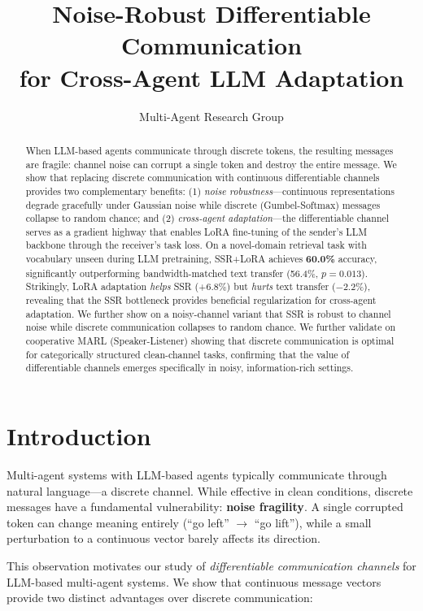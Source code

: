 \documentclass[11pt,a4paper]{article}
\title{\Large\bfseries Noise-Robust Differentiable Communication\\for Cross-Agent LLM Adaptation}
\author{Multi-Agent Research Group}
\date{}
\begin{document}
\maketitle

\begin{abstract}
When LLM-based agents communicate through discrete tokens, the resulting messages are fragile: channel noise can corrupt a single token and destroy the entire message. We show that replacing discrete communication with continuous differentiable channels provides two complementary benefits: (1) \emph{noise robustness}---continuous representations degrade gracefully under Gaussian noise while discrete (Gumbel-Softmax) messages collapse to random chance; and (2) \emph{cross-agent adaptation}---the differentiable channel serves as a gradient highway that enables LoRA fine-tuning of the sender's LLM backbone through the receiver's task loss.
On a novel-domain retrieval task with vocabulary unseen during LLM pretraining, SSR+LoRA achieves \textbf{60.0\%} accuracy, significantly outperforming bandwidth-matched text transfer (56.4\%, $p{=}0.013$). Strikingly, LoRA adaptation \emph{helps} SSR (+6.8\%) but \emph{hurts} text transfer ($-2.2\%$), revealing that the SSR bottleneck provides beneficial regularization for cross-agent adaptation.
We further show on a noisy-channel variant that SSR is robust to channel noise while discrete communication collapses to random chance.
We further validate on cooperative MARL (Speaker-Listener) showing that discrete communication is optimal for categorically structured clean-channel tasks, confirming that the value of differentiable channels emerges specifically in noisy, information-rich settings.
\end{abstract}

\section{Introduction}

Multi-agent systems with LLM-based agents typically communicate through natural language---a discrete channel. While effective in clean conditions, discrete messages have a fundamental vulnerability: \textbf{noise fragility}. A single corrupted token can change meaning entirely (``go left'' $\to$ ``go lift''), while a small perturbation to a continuous vector barely affects its direction.

This observation motivates our study of \emph{differentiable communication channels} for LLM-based multi-agent systems. We show that continuous message vectors provide two distinct advantages over discrete communication:
\end{document}
